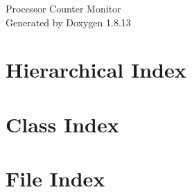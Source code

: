 \documentclass[twoside]{book}
\newcommand{\+}{\discretionary{\mbox{\scriptsize$\hookleftarrow$}}{}{}}
\newcommand{\clearemptydoublepage}{%
  \newpage{\pagestyle{empty}\cleardoublepage}%
}
\begin{document}
\begin{titlepage}
\vspace*{7cm}
\begin{center}%
{\Large Processor Counter Monitor }\\
\vspace*{1cm}
{\large Generated by Doxygen 1.8.13}\\
\end{center}
\end{titlepage}
\clearemptydoublepage
{}
\tableofcontents
\clearemptydoublepage
{}

\chapter{Hierarchical Index}

\chapter{Class Index}

\chapter{File Index}

\end{document}
